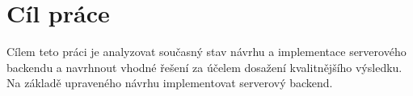\chapter{Cíl práce}
Cílem teto práci je analyzovat současný stav návrhu a implementace serverového backendu a navrhnout vhodné řešení za účelem dosažení kvalitnějšího výsledku. Na základě upraveného návrhu implementovat serverový backend. 